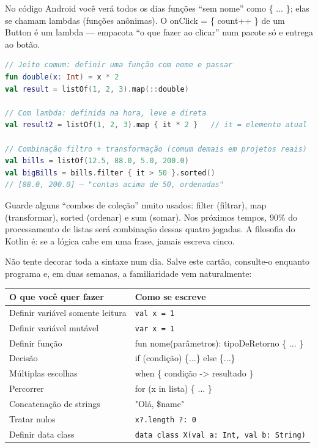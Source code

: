 
No código Android você verá todos os dias funções “sem nome” como \{ ... \}; elas se chamam lambdas (funções anônimas). O onClick = \{ count++ \} de um Button é um lambda — empacota “o que fazer ao clicar” num pacote só e entrega ao botão.

\begin{lstlisting}[language=Kotlin]
// Jeito comum: definir uma função com nome e passar
fun double(x: Int) = x * 2
val result = listOf(1, 2, 3).map(::double)

// Com lambda: definida na hora, leve e direta
val result2 = listOf(1, 2, 3).map { it * 2 }   // it = elemento atual

// Combinação filtro + transformação (comum demais em projetos reais)
val bills = listOf(12.5, 88.0, 5.0, 200.0)
val bigBills = bills.filter { it > 50 }.sorted()
// [88.0, 200.0] — "contas acima de 50, ordenadas"
\end{lstlisting}

Guarde alguns “combos de coleção” muito usados: filter (filtrar), map (transformar), sorted (ordenar) e sum (somar). Nos próximos tempos, 90\% do processamento de listas será combinação dessas quatro jogadas. A filosofia do Kotlin é: se a lógica cabe em uma frase, jamais escreva cinco.


Não tente decorar toda a sintaxe num dia. Salve este cartão, consulte-o enquanto programa e, em duas semanas, a familiaridade vem naturalmente:

\begin{center}
\begin{tabularx}{\linewidth}{|X|X|}
\hline
\textbf{O que você quer fazer} & \textbf{Como se escreve} \tabularnewline
\hline
Definir variável somente leitura & \texttt{val x = 1} \tabularnewline
Definir variável mutável & \texttt{var x = 1} \tabularnewline
Definir função & fun nome(parâmetros): tipoDeRetorno \{ ... \} \tabularnewline
Decisão & if (condição) \{...\} else \{...\} \tabularnewline
Múltiplas escolhas & when \{ condição -> resultado \} \tabularnewline
Percorrer & for (x in lista) \{ ... \} \tabularnewline
Concatenação de strings & "Olá, \$name" \tabularnewline
Tratar nulos & \texttt{x?.\allowbreak length ?: 0} \tabularnewline
Definir data class & \texttt{data class X(val a: Int, val b: String)} \tabularnewline
\hline
\end{tabularx}
\end{center}

